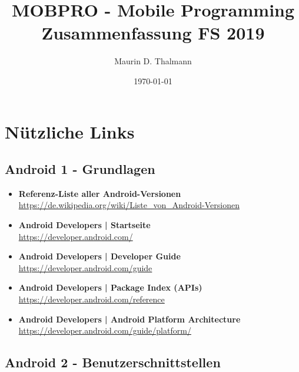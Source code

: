 \documentclass[a4paper]{article}
\title{\textbf{MOBPRO - Mobile Programming\\
Zusammenfassung FS 2019}}
\date{\today}
\author{Maurin D. Thalmann}
\begin{document}
	\maketitle
	\newpage
	\tableofcontents
	\newpage
	
	\section{Nützliche Links}
	
		\subsection{Android 1 - Grundlagen}
		
		\begin{itemize}
			\item \textbf{Referenz-Liste aller Android-Versionen}\\
			\href{https://de.wikipedia.org/wiki/Liste_von_Android-Versionen}
			{https://de.wikipedia.org/wiki/Liste\_von\_Android-Versionen}
			
			\item \textbf{Android Developers | Startseite}\\
			\href{https://developer.android.com/}
			{https://developer.android.com/}
			
			\item \textbf{Android Developers | Developer Guide}\\
			\href{https://developer.android.com/guide}
			{https://developer.android.com/guide}
			
			\item \textbf{Android Developers | Package Index (APIs)}\\
			\href{https://developer.android.com/reference
			}{https://developer.android.com/reference}
			
			\item \textbf{Android Developers | Android Platform Architecture}\\
			\href{https://developer.android.com/guide/platform/}
			{https://developer.android.com/guide/platform/}
		\end{itemize}
	
		\subsection{Android 2 - Benutzerschnittstellen}
		
\end{document}

